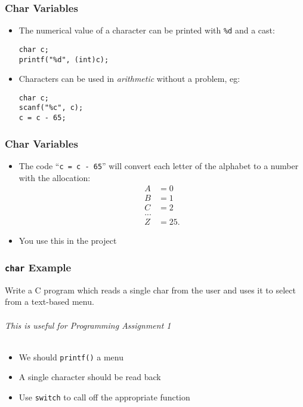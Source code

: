 \documentclass[14pt]{beamer}
\begin{document}
\begin{frame}[fragile]
\frametitle{Char Variables}
\begin{itemize}
\item The numerical value of a character can be printed with \texttt{\%d} and a cast:
\begin{lstlisting}[style=CStyle]
char c;
printf("%d", (int)c);
\end{lstlisting}
\item Characters can be used in \textit{arithmetic} without a problem, eg:
\begin{lstlisting}[style=CStyle]
char c;
scanf("%c", c);
c = c - 65;
\end{lstlisting}
\end{itemize}
\end{frame}

\begin{frame}
\frametitle{Char Variables}
\begin{itemize}
\item The code ``\texttt{c = c - 65}'' will convert each letter of the alphabet to a number with the allocation:
\begin{align*}
A&=0\\
B&=1\\
C&=2\\
 ...\\
Z&=25.
\end{align*}
\pause
\vspace{-5mm}
\item You use this in the project
\end{itemize}
\end{frame}

\begin{frame}
\frametitle{\texttt{char} Example}
Write a C program which reads a single char from the user and uses it to select from a text-based menu.\\
~\\
\textit{This is useful for Programming Assignment 1}\\
~\\
\pause
\begin{itemize}
\item We should \texttt{printf()} a menu
\item A single character should be read back
\item Use \texttt{switch} to call off the appropriate function
\end{itemize}
\end{frame}
\end{document}
